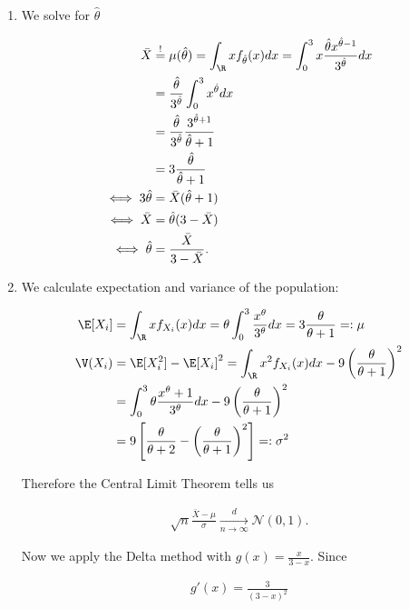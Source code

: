 \begin{solution}

\phantom{}

\begin{enumerate}[label=(\alph*)]
  \item We solve for $\hat{\theta}$

  \begin{align*}
    \bar{X} &\stackrel{!}{=} \mu(\hat{\theta}) = \int_\R x f_{\hat{\theta}}(x) dx
    = \int_0^3 x \frac{\hat{\theta} x^{\hat{\theta}-1}}{3^{\hat{\theta}}} dx \\
    &= \frac{\hat{\theta}}{3^{\hat{\theta}}} \int_0^3 x^{\hat{\theta}} dx \\
    &= \frac{\hat{\theta}}{3^{\hat{\theta}}} \frac{3^{\hat{\theta} + 1}}{\hat{\theta} + 1} \\
    &= 3\frac{\hat{\theta}}{\hat{\theta} + 1} \\
    \iff 3\hat{\theta} &= \bar{X}(\hat{\theta} + 1) \\
    \iff \bar{X} &= \hat{\theta}(3 - \bar{X}) \\
    \iff \hat{\theta} &= \frac{\bar{X}}{3 - \bar{X}}. \\
  \end{align*}
  \item We calculate expectation and variance of the population:

  \begin{align*}
    \E[X_i] &= \int_\R x f_{X_i}(x) dx = \theta \int_0^3 \frac{x^\theta}{3^\theta} dx
    = 3\frac{\theta}{\theta + 1} =: \mu \\
    \V(X_i) &= \E[X_i^2] - \E[X_i]^2 = \int_\R x^2 f_{X_i}(x) dx -
    9\left(\frac{\theta}{\theta + 1}\right)^2 \\
    &= \int_0^3\theta \frac{x^\theta + 1}{3^\theta} dx - 9\left(\frac{\theta}{\theta + 1}\right)^2 \\
    &= 9\left[\frac{\theta}{\theta + 2} -\left(\frac{\theta}{\theta + 1}\right)^2\right] =: \sigma^2
  \end{align*}

  Therefore the Central Limit Theorem tells us

  \begin{align*}
    \sqrt{n}\frac{\bar{X} - \mu}{\sigma} \xrightarrow[n \to \infty]{d}
    \mathcal{N}(0, 1).
  \end{align*}

  Now we apply the Delta method with $g(x) = \frac{x}{3 - x}$. Since

  \begin{align*}
    g'(x) = \frac{3}{(3-x)^2}
  \end{align*}


\end{enumerate}
\end{solution}
